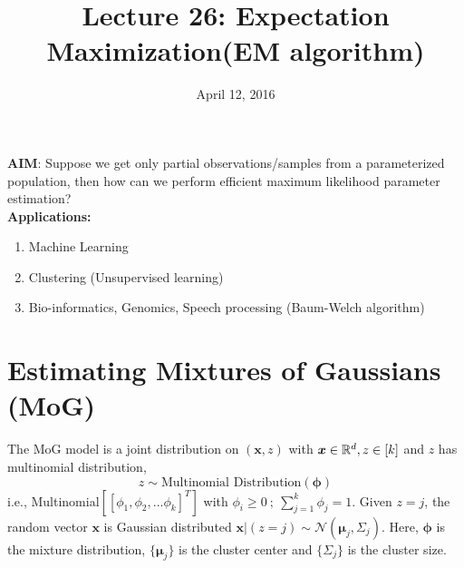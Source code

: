\documentclass[a4paper,english,12pt]{article}
\title{Lecture 26: Expectation Maximization(EM algorithm)}
\date{April 12, 2016}
\author{}
\begin{document}
\maketitle
\textbf{AIM}: Suppose we get only partial observations/samples from a parameterized population, then how can we perform efficient maximum likelihood parameter estimation?\\
\textbf{Applications:}
\begin{enumerate}
\item Machine Learning
\item Clustering (Unsupervised learning)
\item Bio-informatics, Genomics, Speech processing (Baum-Welch algorithm)
\end{enumerate}
\section{Estimating Mixtures of Gaussians (MoG)}
The MoG model is a joint distribution on $(\boldsymbol{x},z)$ with $\boldsymbol{x} \in \mathbb{R}^{d}, z\in [k] $ and $z$ has multinomial distribution,  $$z\sim \text{Multinomial Distribution}(\pmb{\phi})$$ 
i.e., Multinomial$\left[[\phi_1, \phi_2, ... \phi_k]^T\right]$ with $\phi_i\geq0 ~; ~\sum_{j=1}^{k}\phi_j=1.$
Given $z=j$, the random vector $\boldsymbol{x}$ is Gaussian distributed $\boldsymbol{x}|(z=j) \sim \mathcal{N}(\boldsymbol{\mu}_j, \Sigma_j)$. Here, $\pmb{\phi}$ is the mixture distribution, $ \{\boldsymbol{\mu}_j\}$ is the cluster center and $ \{ \Sigma_j\}$ is the cluster size.
\end{document}

